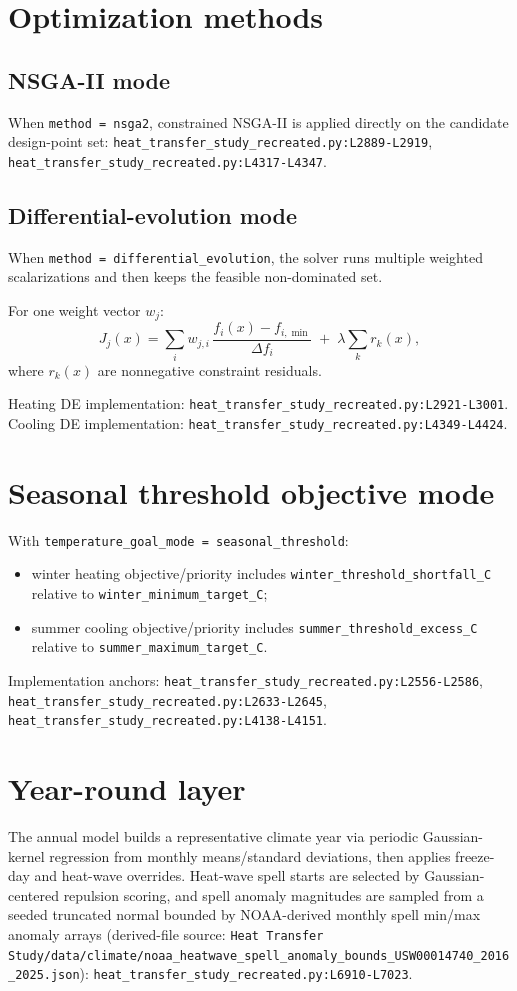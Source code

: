 \documentclass[11pt]{article}
\newcommand{\srcref}[1]{\nolinkurl{#1}}
\newcommand{\code}[1]{\nolinkurl{#1}}
\begin{document}
\section{Optimization methods}
\subsection{NSGA-II mode}
When \code{method = nsga2}, constrained NSGA-II is applied directly on the
candidate design-point set:
\srcref{heat_transfer_study_recreated.py:L2889-L2919},
\srcref{heat_transfer_study_recreated.py:L4317-L4347}.

\subsection{Differential-evolution mode}
When \code{method = differential\_evolution}, the solver runs multiple weighted
scalarizations and then keeps the feasible non-dominated set.

For one weight vector \(w_j\):
\begin{equation}
J_j(x)
=
\sum_i w_{j,i}\,
\frac{f_i(x)-f_{i,\min}}{\Delta f_i}
\;+\;
\lambda \sum_k r_k(x),
\end{equation}
where \(r_k(x)\) are nonnegative constraint residuals.

Heating DE implementation:
\srcref{heat_transfer_study_recreated.py:L2921-L3001}.
Cooling DE implementation:
\srcref{heat_transfer_study_recreated.py:L4349-L4424}.

\section{Seasonal threshold objective mode}
With \code{temperature\_goal\_mode = seasonal\_threshold}:
\begin{itemize}[leftmargin=*]
\item winter heating objective/priority includes
\code{winter\_threshold\_shortfall\_C} relative to
\code{winter\_minimum\_target\_C};
\item summer cooling objective/priority includes
\code{summer\_threshold\_excess\_C} relative to
\code{summer\_maximum\_target\_C}.
\end{itemize}
Implementation anchors:
\srcref{heat_transfer_study_recreated.py:L2556-L2586},
\srcref{heat_transfer_study_recreated.py:L2633-L2645},
\srcref{heat_transfer_study_recreated.py:L4138-L4151}.

\section{Year-round layer}
The annual model builds a representative climate year via periodic Gaussian-kernel
regression from monthly means/standard deviations, then applies freeze-day and
heat-wave overrides. Heat-wave spell starts are selected by Gaussian-centered
repulsion scoring, and spell anomaly magnitudes are sampled from a seeded
truncated normal bounded by NOAA-derived monthly spell min/max anomaly arrays
(derived-file source:
\code{Heat Transfer Study/data/climate/noaa\_heatwave\_spell\_anomaly\_bounds\_USW00014740\_2016\_2025.json}):
\srcref{heat_transfer_study_recreated.py:L6910-L7023}.
\end{document}
